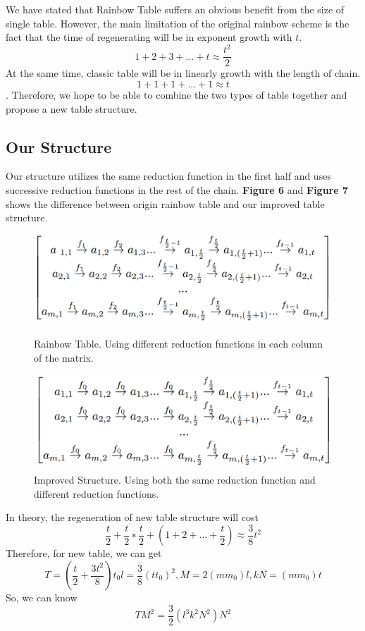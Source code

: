 \documentclass[runningheads,a4paper]{llncs}
\begin{document}
We have stated that Rainbow Table suffers an obvious benefit from the size of single table. However, the main limitation of the original rainbow scheme is the fact that the time of regenerating will be in exponent growth with $t$\cite{oechslin2003making}.  
$$1 + 2 + 3 + ... + t \approx \frac{t^2}{2}$$
At the same time, classic table will be in linearly growth\cite{hellman1980cryptanalytic} with the length of chain.
$$1 + 1 + 1 + ... + 1 \approx t$$.
Therefore, we hope to be able to combine the two types of table together and propose a new table structure.
\subsection{Our Structure}
Our structure utilizes the same reduction function in the first half and uses successive reduction functions in the rest of the chain. \textbf{Figure 6} and \textbf{Figure 7} shows the difference between origin rainbow table and our improved table structure.

\begin{figure}[!htb]
  \includegraphics[width=\linewidth]{graph6}
  \caption{Rainbow Table. Using different reduction functions in each column of the matrix.}
\endminipage\hfill
{}
  \includegraphics[width=\linewidth]{graph7}
  \caption{Improved Structure. Using both the same reduction function and different reduction functions.}
\endminipage\hfill
\end{figure}

In theory, the regeneration of new table structure will cost 
$$\frac{t}{2} + \frac{t}{2}∗\frac{t}{2} + (1 + 2 + ...+ \frac{t}{2}) \approx \frac{3}{8} t^2$$
Therefore, for new table, we can get 
$$T = (\frac{t}{2} + \frac{3t^2}{8})t_0 l = \frac{3}{8} (tt_0)^2 , M = 2(mm_0)l, k N = (mm_0) t$$ 
So, we can know 
$$TM^2 = \frac{3}{2}(l^3 k^2 N^2) N^2$$
\end{document}
